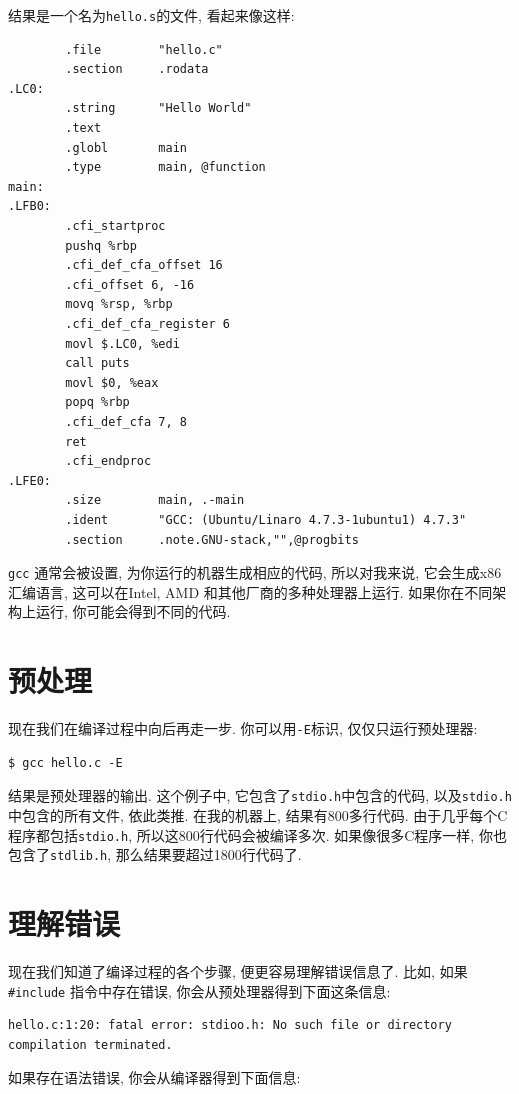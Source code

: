 \documentclass[12pt]{book}
\begin{document}
{结果是一个名为{\tt hello.s}的文件, 看起来像这样:

\begin{verbatim}
        .file        "hello.c"
        .section     .rodata
.LC0:
        .string      "Hello World"
        .text
        .globl       main
        .type        main, @function
main:
.LFB0:
        .cfi_startproc
        pushq %rbp
        .cfi_def_cfa_offset 16
        .cfi_offset 6, -16
        movq %rsp, %rbp
        .cfi_def_cfa_register 6
        movl $.LC0, %edi
        call puts
        movl $0, %eax
        popq %rbp
        .cfi_def_cfa 7, 8
        ret
        .cfi_endproc
.LFE0:
        .size        main, .-main
        .ident       "GCC: (Ubuntu/Linaro 4.7.3-1ubuntu1) 4.7.3"
        .section     .note.GNU-stack,"",@progbits
\end{verbatim}

{\tt gcc} 通常会被设置, 为你运行的机器生成相应的代码,
所以对我来说, 它会生成x86汇编语言,
这可以在Intel, AMD 和其他厂商的多种处理器上运行.
如果你在不同架构上运行, 你可能会得到不同的代码.


\section{预处理}

现在我们在编译过程中向后再走一步.
你可以用{\tt -E}标识, 仅仅只运行预处理器:

\begin{verbatim}
$ gcc hello.c -E
\end{verbatim}

结果是预处理器的输出.
这个例子中, 它包含了{\tt stdio.h}中包含的代码, 
以及{\tt stdio.h}中包含的所有文件, 依此类推.
在我的机器上, 结果有800多行代码.
由于几乎每个C程序都包括{\tt stdio.h}, 所以这800行代码会被编译多次.
如果像很多C程序一样, 你也包含了{\tt stdlib.h},
那么结果要超过1800行代码了.


\section{理解错误}

现在我们知道了编译过程的各个步骤, 
便更容易理解错误信息了.
比如, 如果\verb"#include" 指令中存在错误, 
你会从预处理器得到下面这条信息:

\begin{verbatim}
hello.c:1:20: fatal error: stdioo.h: No such file or directory
compilation terminated.
\end{verbatim}

如果存在语法错误, 你会从编译器得到下面信息:

}
\end{document}
